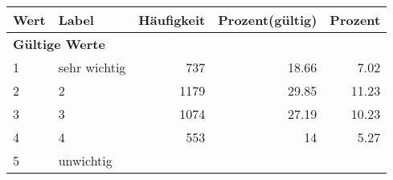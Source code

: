      \begin{longtable}{lXrrr}
     \toprule
     \textbf{Wert} & \textbf{Label} & \textbf{Häufigkeit} & \textbf{Prozent(gültig)} & \textbf{Prozent} \\
     \endhead
     \midrule
     \multicolumn{5}{l}{\textbf{Gültige Werte}}\\

     1 &
     \multicolumn{1}{X}{ sehr wichtig   } &


       \num{737} &
       \num[round-mode=places,round-precision=2]{18,66} &
         \num[round-mode=places,round-precision=2]{7,02} \\

     2 &
     \multicolumn{1}{X}{ 2   } &


       \num{1179} &
       \num[round-mode=places,round-precision=2]{29,85} &
         \num[round-mode=places,round-precision=2]{11,23} \\

     3 &
     \multicolumn{1}{X}{ 3   } &


       \num{1074} &
       \num[round-mode=places,round-precision=2]{27,19} &
         \num[round-mode=places,round-precision=2]{10,23} \\

     4 &
     \multicolumn{1}{X}{ 4   } &


       \num{553} &
       \num[round-mode=places,round-precision=2]{14} &
         \num[round-mode=places,round-precision=2]{5,27} \\

     5 &
     \multicolumn{1}{X}{ unwichtig   } &



\end{longtable}

